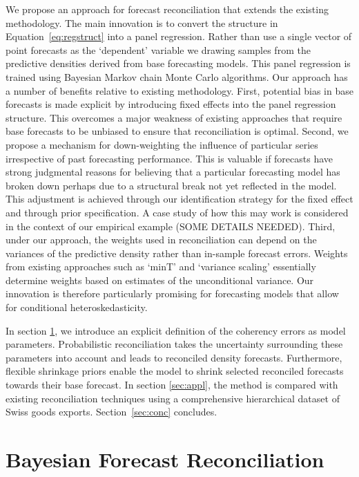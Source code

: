 \documentclass[a4paper,fleqn,11pt]{article}
\begin{document}
We propose an approach for forecast reconciliation that extends the existing methodology.  The main innovation is to convert the structure in Equation~\ref{eq:regstruct} into a panel regression. Rather than use a single vector of point forecasts as the `dependent' variable we drawing samples from the predictive densities derived from base forecasting models.  This panel regression is trained using Bayesian Markov chain Monte Carlo algorithms. Our approach has a number of benefits relative to existing methodology. First, potential bias in base forecasts is made explicit by introducing fixed effects into the panel regression structure.  This overcomes a major weakness of existing approaches that require base forecasts to be unbiased to ensure that reconciliation is optimal.  Second, we propose a mechanism for down-weighting the influence of particular series irrespective of past forecasting performance. This is valuable if forecasts have strong judgmental reasons for believing that a particular forecasting model has broken down perhaps due to a structural break not yet reflected in the model.  This adjustment is achieved through our identification strategy for the fixed effect and through prior specification.  A case study of how this may work is considered in the context of our empirical example (SOME DETAILS NEEDED).  Third, under our approach, the weights used in reconciliation can depend on the variances of the predictive density rather than in-sample forecast errors.  Weights from existing approaches such as `minT' and `variance scaling' essentially determine weights based on estimates of the unconditional variance.  Our innovation is therefore particularly promising for forecasting models that allow for conditional heteroskedasticity.  

In section \ref{sec:model}, we introduce an explicit definition of the coherency errors as model parameters. Probabilistic reconciliation takes the uncertainty surrounding these parameters into account and leads to reconciled density forecasts. Furthermore, flexible shrinkage priors enable the model to shrink selected reconciled forecasts towards their base forecast. In section \ref{sec:appl}, the method is compared with existing reconciliation techniques using a comprehensive hierarchical dataset of Swiss goods exports. Section~\ref{sec:conc} concludes.

\clearpage

\section{Bayesian Forecast Reconciliation}
\label{sec:model}
\end{document}
